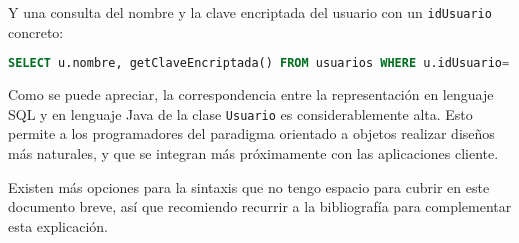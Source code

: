 \documentclass[12pt, a4paper]{article}
\begin{document}
Y una consulta del nombre y la clave encriptada del usuario con un \texttt{idUsuario} concreto:

\begin{center}
    \begin{minipage}[c]{0,7\textwidth}
\begin{lstlisting}[language=SQL]
SELECT u.nombre, getClaveEncriptada() FROM usuarios WHERE u.idUsuario='id';
\end{lstlisting}
    \end{minipage}
\end{center}

Como se puede apreciar, la correspondencia entre la representación en lenguaje SQL y en lenguaje Java de la clase \texttt{Usuario} es considerablemente alta. Esto permite a los programadores del paradigma orientado a objetos realizar diseños más naturales, y que se integran más próximamente con las aplicaciones cliente.

Existen más opciones para la sintaxis que no tengo espacio para cubrir en este documento breve, así que recomiendo recurrir a la bibliografía para complementar esta explicación.

\nocite{*}

\end{document}
